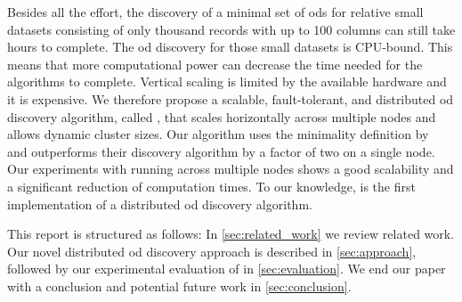   Besides all the effort, the discovery of a minimal set of \glspl{od} for relative small datasets consisting of only thousand records with up to 100 columns can still take hours to complete.
  The \gls{od} discovery for those small datasets is CPU-bound.
  This means that more computational power can decrease the time needed for the algorithms to complete.
  Vertical scaling is limited by the available hardware and it is expensive.
  We therefore propose a scalable, fault-tolerant, and distributed \gls{od} discovery algorithm, called \dodo{}, that scales horizontally across multiple nodes and allows dynamic cluster sizes.
  Our algorithm uses the minimality definition by \citeauthor{consonni}~\cite{consonni} and outperforms their discovery algorithm \ocddiscover{} by a factor of two on a single node.
  Our experiments with running \dodo{} across multiple nodes shows a good scalability and a significant reduction of computation times.
  To our knowledge, \dodo{} is the first implementation of a distributed \gls{od} discovery algorithm.

  This report is structured as follows:
  In \cref{sec:related_work} we review related work.
  Our novel distributed \gls{od} discovery approach \dodo{} is described in \cref{sec:approach}, followed by our experimental evaluation of \dodo{} in \cref{sec:evaluation}.
  We end our paper with a conclusion and potential future work in \cref{sec:conclusion}.
